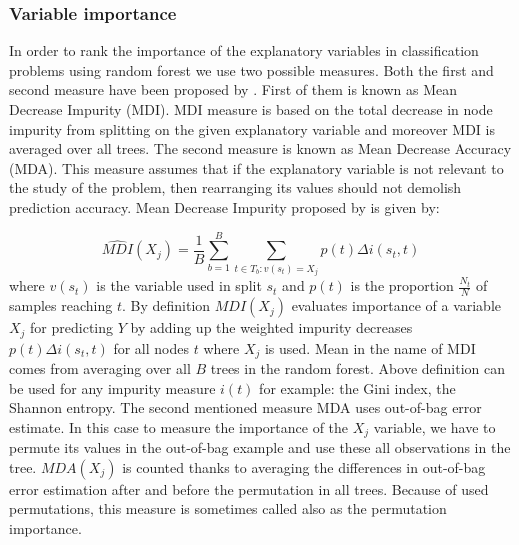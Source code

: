 \subsubsection{Variable importance}
In order to rank the importance of the explanatory variables in classification problems using random forest 
we use two possible measures. Both the first and second measure have been proposed by \cite{breiman2001random}. 
First of them is known as Mean Decrease Impurity (MDI). MDI measure is based on the total decrease in node impurity from splitting 
on the given explanatory variable and moreover MDI is averaged over all trees. 
The second measure is known as Mean Decrease Accuracy (MDA). 
This measure assumes that if the explanatory variable is not relevant to the study of the problem, 
then rearranging its values should not demolish prediction accuracy. Mean Decrease Impurity proposed 
by \cite{breiman2001random} is given by: 

\begin{equation}
	\widehat{MDI}( X_{j} ) = \frac{1}{B} \displaystyle \sum_{b=1}^{B}  \displaystyle\sum_{t \in T_{b}: v(s_{t}) 
	=  X_{j}  } p(t)\Delta i(s_{t}, t)
\end{equation}
where $ v(s_{t}) $ is the variable used in split $s_{t}$ and $ p(t) $ is the proportion $\frac{N_{t}}{N}$ of samples reaching $t$.
By definition $ MDI( X_{j} ) $ evaluates importance of a variable $ X_{j} $ for predicting $Y$ by 
adding up the weighted impurity decreases $p(t) \Delta i(s_{t}, t)$ for all nodes $t$ where $ X_{j}$ is used. 
Mean in the name of MDI comes from averaging over all $B$ trees in the random forest. 
Above definition can be used for any impurity measure $i(t)$ for example: the Gini index, the Shannon entropy. 
The second mentioned measure MDA uses out-of-bag error estimate. 
In this case to measure the importance of the $X_{j}$ variable, we have to permute its values in the out-of-bag example and 
use these all observations in the tree. $ MDA( X_{j} )$ is counted thanks to averaging the differences in 
out-of-bag error estimation after and before the permutation in all trees. Because of used permutations, 
this measure is sometimes called also as the permutation importance.

